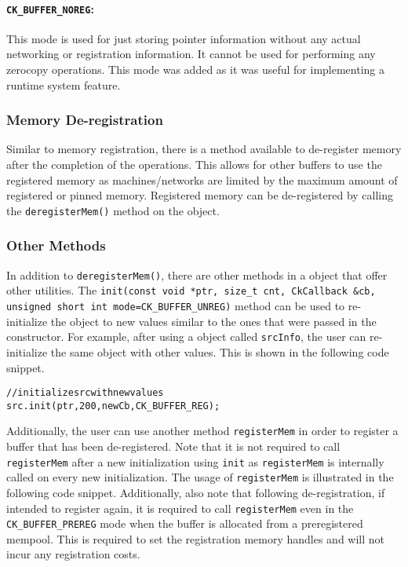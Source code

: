 \paragraph{{\tt CK\_BUFFER\_NOREG}:}
This mode is used for just storing pointer information without any actual networking
or registration information. It cannot be used for performing any zerocopy operations.
This mode was added as it was useful for implementing a runtime system feature.

\subsubsection{Memory De-registration}
Similar to memory registration, there is a method available to de-register
memory after the completion of the operations. This allows for other buffers to use the
registered memory as machines/networks are limited by the maximum amount of registered or
pinned memory. Registered memory can be de-registered by calling the \texttt{deregisterMem()}
method on the  object.

\subsubsection{Other Methods}
In addition to \texttt{deregisterMem()}, there are other methods in a  object
that offer other utilities. The
{\tt init(const void *ptr, size\_t cnt, CkCallback \&cb,
unsigned short int mode=CK\_BUFFER\_UNREG)}
method can be used to re-initialize the  object to new values similar to the ones that
were passed in the constructor. For example, after using a  object called \texttt{srcInfo},
the user can re-initialize the same object with other values. This is shown in the following code snippet.

\begin{alltt}
// initialize src with new values
src.init(ptr, 200, newCb, CK_BUFFER_REG);
\end{alltt}

Additionally, the user can use another method \texttt{registerMem} in order to register a buffer that has
been de-registered. Note that it is not required to call \texttt{registerMem} after a new initialization
using \texttt{init} as \texttt{registerMem} is internally called on every new initialization. The usage of
\texttt{registerMem} is illustrated in the following code snippet. Additionally, also note that following
de-registration, if intended to register again, it is required to call \texttt{registerMem} even in the
{\tt CK\_BUFFER\_PREREG} mode when the buffer is allocated from a preregistered
mempool. This is required to set the registration memory handles and will not incur any registration costs.

